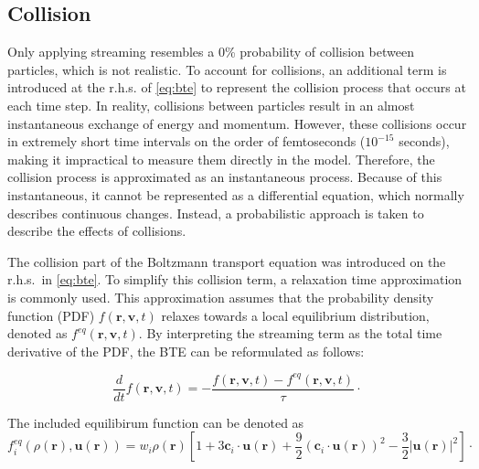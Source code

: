 \subsection{Collision}\label{subsec:collision}
Only applying streaming resembles a 0\% probability of collision between particles, which is not realistic.
To account for collisions, an additional term is introduced at the r.h.s. of \cref{eq:bte} to represent the collision process that occurs at each time step.
In reality, collisions between particles result in an almost instantaneous exchange of energy and momentum.
However, these collisions occur in extremely short time intervals on the order of femtoseconds (\(10^{-15}\) seconds), making it impractical to measure them directly in the model.
Therefore, the collision process is approximated as an instantaneous process.
Because of this instantaneous, it cannot be represented as a differential equation, which normally describes continuous changes.
Instead, a probabilistic approach is taken to describe the effects of collisions.
\newline

The collision part of the Boltzmann transport equation was introduced on the r.h.s.\ in \cref{eq:bte}.
To simplify this collision term, a relaxation time approximation is commonly used.
This approximation assumes that the probability density function (PDF) \(f\left(\mathbf{r},\mathbf{v},t\right)\) relaxes towards a local equilibrium distribution, denoted as \(f^{eq}\left(\mathbf{r},\mathbf{v},t\right)\).
By interpreting the streaming term as the total time derivative of the PDF, the BTE can be reformulated as follows:

\begin{equation}
    \frac{d}{dt} f\left(\mathbf{r},\mathbf{v},t\right) = -\frac{ f\left(\mathbf{r},\mathbf{v},t\right)- f^{eq}\left(\mathbf{r},\mathbf{v},t\right)}{\tau}
    \cdot
    \label{eq:bgk}
\end{equation}

The included equilibirum function can be denoted as
\begin{equation}
    f_i^{eq}(\rho(\mathbf{r}),\mathbf{u}(\mathbf{r}))
    =w_i\rho(\mathbf{r})
    \left[
        1+3\mathbf{c}_i\cdot\mathbf{u}(\mathbf{r})
        +\frac{9}{2}\left(\mathbf{c}_i\cdot\mathbf{u}(\mathbf{r})\right)^2
        -\frac{3}{2}|\mathbf{u}(\mathbf{r})|^2
        \right]
    \cdot
    \label{eq:feq}
\end{equation}

